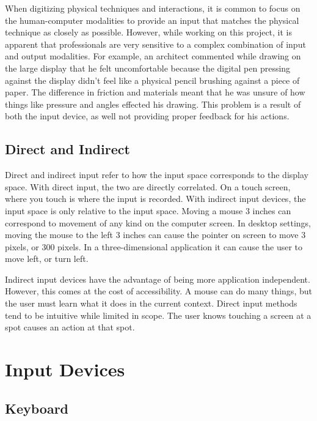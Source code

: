 \documentclass[11pt]{report}
\begin{document}
When digitizing physical techniques and interactions, it is common to focus on the human-computer modalities to provide an input that matches the physical technique as closely as possible.
However, while working on this project, it is apparent that professionals are very sensitive to a complex combination of input and output modalities. 
For example, an architect commented while drawing on the large display that he felt uncomfortable because the digital pen pressing against the display didn't feel like a physical pencil brushing against a piece of paper. 
The difference in friction and materials meant that he was unsure of how things like pressure and angles effected his drawing.
This problem is a result of both the input device, as well not providing proper feedback for his actions.

\subsection{Direct and Indirect}
Direct and indirect input refer to how the input space corresponds to the display space. 
With direct input, the two are directly correlated. 
On a touch screen, where you touch is where the input is recorded. 
With indirect input devices, the input space is only relative to the input space. Moving a mouse 3 inches can correspond to movement of any kind on the computer screen. 
In desktop settings, moving the mouse to the left 3 inches can cause the pointer on screen to move 3 pixels, or 300 pixels. 
In a three-dimensional application it can cause the user to move left, or turn left.

Indirect input devices have the advantage of being more application independent. However, this comes at the cost of accessibility. 
A mouse can do many things, but the user must learn what it does in the current context. 
Direct input methods tend to be intuitive while limited in scope. 
The user knows touching a screen at a spot causes an action at that spot.

\section{Input Devices}
\subsection{Keyboard}
\end{document}

